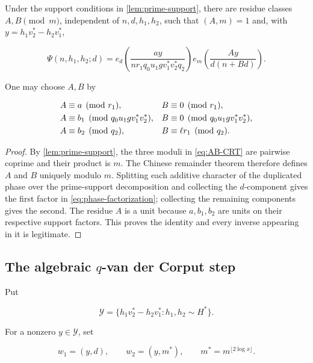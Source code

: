 \begin{lemma}\label{lem:phase-factorization}
Under the support conditions in \cref{lem:prime-support}, there are residue
classes $A,B\pmod m$, independent of $n,d,h_1,h_2$, such that $(A,m)=1$
and, with $y=h_1v_2^*-h_2v_1^*$,

\begin{equation}\label{eq:phase-factorization}
 \Psi(n,h_1,h_2;d)
 =e_d\!\left(
   \frac{ay}{nr_1q_0u_1gv_1^*v_2^*q_2}
  \right)
  e_m\!\left(\frac{Ay}{d(n+Bd)}\right).
\end{equation}

One may choose $A,B$ by

\begin{align}
 A&\equiv a\pmod{r_1},& B&\equiv0\pmod{r_1},\notag\\
 A&\equiv b_1\pmod{q_0u_1gv_1^*v_2^*},&
 B&\equiv0\pmod{q_0u_1gv_1^*v_2^*},\notag\\
 A&\equiv b_2\pmod{q_2},& B&\equiv\ell r_1\pmod{q_2}.
 \label{eq:AB-CRT}
\end{align}
\end{lemma}

\begin{proof}
By \cref{lem:prime-support}, the three moduli in
\cref{eq:AB-CRT} are pairwise coprime and their product is $m$.
The Chinese remainder theorem therefore defines $A$ and $B$ uniquely modulo
$m$.  Splitting each additive character of the duplicated phase over the
prime-support decomposition and collecting the $d$-component gives the first
factor in \cref{eq:phase-factorization}; collecting the remaining components
gives the second.  The residue $A$ is a unit because $a,b_1,b_2$ are units on
their respective support factors.  This proves the identity and every
inverse appearing in it is legitimate.
\end{proof}

\subsection{The algebraic \texorpdfstring{$q$}{q}-van der Corput step}

Put

\begin{equation}\label{eq:Yset}
 \mathscr Y=\{h_1v_2^*-h_2v_1^*:h_1,h_2\sim H^*\}.
\end{equation}

For a nonzero $y\in\mathscr Y$, set

\[
 w_1=(y,d),\qquad w_2=(y,m^*),\qquad
 m^*=m^{\lfloor2\log x\rfloor}.
\]

